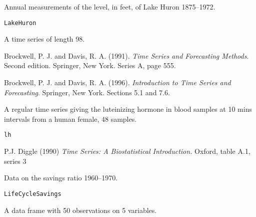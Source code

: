 %
\begin{Description}\relax
Annual measurements of the level, in feet, of Lake Huron 1875--1972.
\end{Description}
%
\begin{Usage}
\begin{verbatim}
LakeHuron
\end{verbatim}
\end{Usage}
%
\begin{Format}
A time series of length 98.
\end{Format}
%
\begin{Source}\relax
Brockwell, P. J. and Davis, R. A. (1991).
\emph{Time Series and Forecasting Methods}.
Second edition. Springer, New York. Series A, page 555.

Brockwell, P. J. and Davis, R. A. (1996).
\emph{Introduction to Time Series and Forecasting}.
Springer, New York.
Sections 5.1 and 7.6.
\end{Source}
%
\begin{Description}\relax
A regular time series giving the luteinizing hormone in blood
samples at 10 mins intervals from a human female, 48 samples.
\end{Description}
%
\begin{Usage}
\begin{verbatim}
lh
\end{verbatim}
\end{Usage}
%
\begin{Source}\relax
P.J. Diggle (1990)
\emph{Time Series: A Biostatistical Introduction.}
Oxford, table A.1, series 3
\end{Source}
%
\begin{Description}\relax
Data on the savings ratio 1960--1970.
\end{Description}
%
\begin{Usage}
\begin{verbatim}
LifeCycleSavings
\end{verbatim}
\end{Usage}
%
\begin{Format}
A data frame with 50 observations on 5 variables.

\end{Format}
